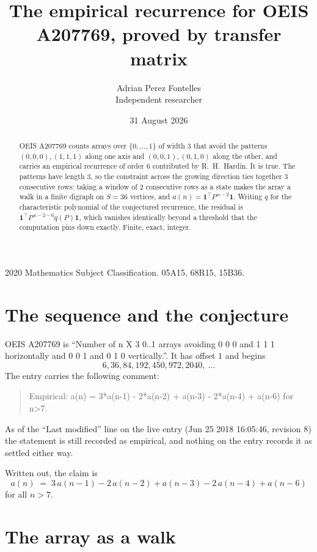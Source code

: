 \documentclass[11pt,a4paper]{article}
\title{The empirical recurrence for OEIS A207769, proved by transfer matrix}
\author{Adrian Perez Fontelles\\ \small Independent researcher}
\date{31 August 2026}
\theoremstyle{plain}
\theoremstyle{definition}
\begin{document}
\maketitle

\begin{abstract}
OEIS A207769 counts arrays over $\{0,\dots,1\}$ of width $3$ that avoid the patterns
$(0,0,0), (1,1,1)$ along one axis and $(0,0,1), (0,1,0)$ along the other, and carries an empirical recurrence of
order $6$ contributed by R.~H.~Hardin. It is true. The patterns have length $3$, so
the constraint across the growing direction ties together $3$ consecutive rows: taking a
window of $2$ consecutive rows as a state makes the array a walk in a finite digraph
on $S=36$ vertices, and $a(n)=\mathbf{1}^{\!\top}P^{\,n-2}\mathbf{1}$. Writing $q$
for the characteristic polynomial of the conjectured recurrence, the residual is
$\mathbf{1}^{\!\top}P^{\,n-2-6}q(P)\mathbf{1}$, which vanishes identically
beyond a threshold that the computation pins down exactly. Finite, exact, integer.
\end{abstract}

\noindent\small 2020 Mathematics Subject Classification. 05A15, 68R15, 15B36.\normalsize

\section{The sequence and the conjecture}

OEIS A207769 is ``Number of n X 3 0..1 arrays avoiding 0 0 0 and 1 1 1 horizontally and 0 0 1 and 0 1 0 vertically.''. It has offset
$1$ and begins
\[
6, 36, 84, 192, 450, 972, 2040,\ \dots
\]
The entry carries the following comment:
\begin{quote}\small
Empirical: a(n) = 3*a(n-1) - 2*a(n-2) + a(n-3) - 2*a(n-4) + a(n-6) for n>7.
\end{quote}
As of the ``Last modified'' line on the live entry (Jun 25 2018 16:05:46, revision
8) the statement is still recorded as empirical, and nothing on the entry
records it as settled either way.

Written out, the claim is
\begin{equation}\label{eq:conj}
a(n)\;=\;3\,a(n-1) - 2\,a(n-2) + a(n-3) - 2\,a(n-4) + a(n-6)
\end{equation}
for all $n>7$. 

\section{The array as a walk}
\end{document}

